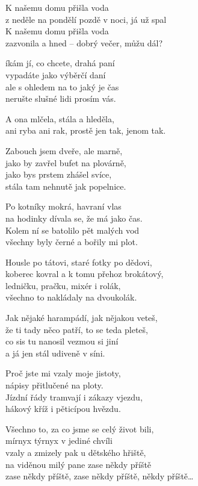 
\ve{}
K našemu domu přišla voda\\
z neděle na pondělí pozdě v noci, já už spal\\
K našemu domu přišla voda\\
zazvonila a hned -- dobrý večer, můžu dál?

íkám jí, co chcete, drahá paní\\
vypadáte jako výběrčí daní\\
ale s ohledem na to jaký je čas\\
nerušte slušné lidi prosím vás.

\cho{}
A ona mlčela, stála a hleděla,\\
ani ryba ani rak, prostě jen tak, jenom tak.

\ve{}
Zabouch jsem dveře, ale marně,\\
jako by zavřel bufet na plovárně,\\
jako bys prstem zhášel svíce,\\
stála tam nehnutě jak popelnice.

Po kotníky mokrá, havraní vlas\\
na hodinky dívala se, že má jako čas.\\
Kolem ní se batolilo pět malých vod\\
všechny byly černé a bořily mi plot.

\cho{}

\ve{}
Housle po tátovi, staré fotky po dědovi,\\
koberec kovral a k tomu přehoz brokátový,\\
ledničku, pračku, mixér i rolák,\\
všechno to nakládaly na dvoukolák.

Jak nějaké harampádí, jak nějakou veteš,\\
že ti tady něco patří, to se teda pleteš,\\
co sis tu nanosil vezmou si jiní\\
a já jen stál udiveně v síni.

\cho{}

\ve{}
Proč jste mi vzaly moje jistoty,\\
nápisy  přitlučené na ploty.\\
Jízdní řády tramvají i zákazy vjezdu,\\
hákový kříž i pěticípou hvězdu.

Všechno to, za co jsme se celý život bili,\\
mírnyx týrnyx v jediné chvíli\\
vzaly a zmizely pak u dětského hřiště,\\
na viděnou milý pane zase někdy příště\\
zase někdy příště, zase někdy příště, někdy příště\ldots

\esong{}